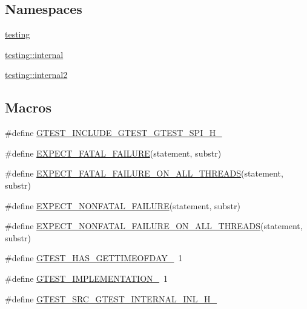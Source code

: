 \subsection*{Namespaces}
\begin{DoxyCompactItemize}
\item 
\hyperlink{namespacetesting}{testing}
\item 
\hyperlink{namespacetesting_1_1internal}{testing\-::internal}
\item 
\hyperlink{namespacetesting_1_1internal2}{testing\-::internal2}
\end{DoxyCompactItemize}
\subsection*{Macros}
\begin{DoxyCompactItemize}
\item 
\#define \hyperlink{fused-src_2gtest_2gtest-all_8cc_a2f159eaa9c00e7aa9fd6b296e520e35c}{G\-T\-E\-S\-T\-\_\-\-I\-N\-C\-L\-U\-D\-E\-\_\-\-G\-T\-E\-S\-T\-\_\-\-G\-T\-E\-S\-T\-\_\-\-S\-P\-I\-\_\-\-H\-\_\-}
\item 
\#define \hyperlink{fused-src_2gtest_2gtest-all_8cc_a819a3fd7f8b8cf24b6f1b3a26708973d}{E\-X\-P\-E\-C\-T\-\_\-\-F\-A\-T\-A\-L\-\_\-\-F\-A\-I\-L\-U\-R\-E}(statement, substr)
\item 
\#define \hyperlink{fused-src_2gtest_2gtest-all_8cc_ad8aac5bc859b2ddc07583636ae4f45cf}{E\-X\-P\-E\-C\-T\-\_\-\-F\-A\-T\-A\-L\-\_\-\-F\-A\-I\-L\-U\-R\-E\-\_\-\-O\-N\-\_\-\-A\-L\-L\-\_\-\-T\-H\-R\-E\-A\-D\-S}(statement, substr)
\item 
\#define \hyperlink{fused-src_2gtest_2gtest-all_8cc_a8376fd6821bd88fd806697355e79e138}{E\-X\-P\-E\-C\-T\-\_\-\-N\-O\-N\-F\-A\-T\-A\-L\-\_\-\-F\-A\-I\-L\-U\-R\-E}(statement, substr)
\item 
\#define \hyperlink{fused-src_2gtest_2gtest-all_8cc_a9f4cf1f150fe9facfc4cbf0bae646ee9}{E\-X\-P\-E\-C\-T\-\_\-\-N\-O\-N\-F\-A\-T\-A\-L\-\_\-\-F\-A\-I\-L\-U\-R\-E\-\_\-\-O\-N\-\_\-\-A\-L\-L\-\_\-\-T\-H\-R\-E\-A\-D\-S}(statement, substr)
\item 
\#define \hyperlink{fused-src_2gtest_2gtest-all_8cc_a7c139c1711de5a69cbc934e8a082e4f9}{G\-T\-E\-S\-T\-\_\-\-H\-A\-S\-\_\-\-G\-E\-T\-T\-I\-M\-E\-O\-F\-D\-A\-Y\-\_\-}~1
\item 
\#define \hyperlink{fused-src_2gtest_2gtest-all_8cc_a83bd232fd1077579fada92c31bb7469f}{G\-T\-E\-S\-T\-\_\-\-I\-M\-P\-L\-E\-M\-E\-N\-T\-A\-T\-I\-O\-N\-\_\-}~1
\item 
\#define \hyperlink{fused-src_2gtest_2gtest-all_8cc_ab740e029f81d48cfba1b34cecce63fef}{G\-T\-E\-S\-T\-\_\-\-S\-R\-C\-\_\-\-G\-T\-E\-S\-T\-\_\-\-I\-N\-T\-E\-R\-N\-A\-L\-\_\-\-I\-N\-L\-\_\-\-H\-\_\-}

\end{DoxyCompactItemize}

